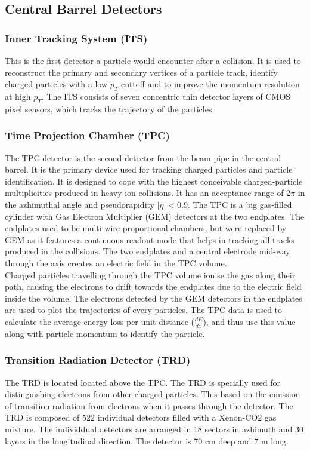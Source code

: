 \documentclass[12pt,a4paper,twoside]{report}
\begin{document}
\subsection{Central Barrel Detectors}
\subsubsection{Inner Tracking System (ITS)}
This is the first detector a particle would encounter after a collision. It is used to reconstruct the primary and secondary vertices of a particle track, identify charged particles with a low $p_T$ cuttoff and to improve the momentum resolution at high $p_T$. The ITS consists of seven concentric thin detector layers of CMOS pixel sensors, which tracks the trajectory of the particles. \cite{Ref:ALICE-detectors-ITS}
\subsubsection{Time Projection Chamber (TPC)}
The TPC detector is the second detector from the beam pipe in the central barrel. It is the primary device used for tracking charged particles and particle identification. It is designed to cope with the highest conceivable charged-particle multiplicities produced in heavy-ion collisions. It has an acceptance range of $2\pi$ in the azhimuthal angle and pseudorapidity $|\eta|<0.9$. The TPC is a big gas-filled cylinder with Gas Electron Multiplier (GEM) detectors at the two endplates. The endplates used to be multi-wire proportional chambers, but were replaced by GEM as it features a continuous readout mode that helps in tracking all tracks produced in the collisions. The two endplates and a central electrode mid-way through the axis creates an electric field in the TPC volume.\\
Charged particles travelling through the TPC volume ionise the gas along their path, causing the electrons to drift towards the endplates due to the electric field inside the volume. The electrons detected by the GEM detectors in the endplates are used to plot the trajectories of every particles. The TPC data is used to calculate the average energy loss per unit distance ($\frac{dE}{dx}$), and thus use this value along with particle momentum to identify the particle. \cite{Ref:ALICE-detectors-TPC}
\subsubsection{Transition Radiation Detector (TRD)}
The TRD is located located above the TPC. The TRD is specially used for distinguishing electrons from other charged particles. This based on the emission of transition radiation from electrons when it passes through the detector. The TRD is composed of 522 individual detectors filled with a Xenon-CO2 gas mixture. The individdual detectors are arranged in 18 sectors in azhimuth and 30 layers in the longitudinal direction. The detector is 70 cm deep and 7 m long. \cite{Ref:ALICE-detectors-TRD}
\end{document}
